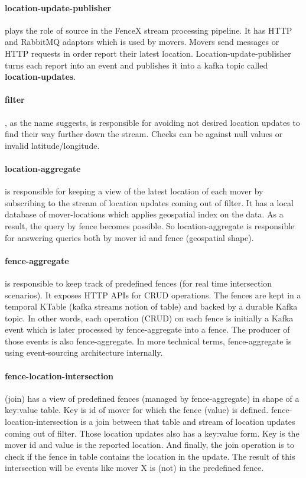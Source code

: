 \documentclass[a4]{report}
\begin{document}
        \paragraph{location-update-publisher} plays the role of source in the FenceX stream processing pipeline.
        It has HTTP and RabbitMQ adaptors which is used by movers.
        Movers send messages or HTTP requests in order report their latest location.
        Location-update-publisher turns each report into an event and publishes it into a kafka topic called
        \textbf{location-updates}.

        \paragraph{filter}, as the name suggests, is responsible  for avoiding not desired location updates to find their
        way further down the stream.
        Checks can be against null values or invalid latitude/longitude.

        \paragraph{location-aggregate} is responsible for keeping a view of the latest location of each mover by
        subscribing to the stream of location updates coming out of filter.
        It has a local database of mover-locations which applies geospatial index on the data.
        As a result, the query by fence becomes possible.
        So location-aggregate is responsible for answering queries both by mover id and fence (geospatial shape).

        \paragraph{fence-aggregate} is responsible to keep track of predefined fences (for real time intersection scenarios).
        It exposes HTTP APIs for CRUD operations.
        The fences are kept in a temporal KTable (kafka streams notion of table) and backed by a durable Kafka topic.
        In other words, each operation (CRUD) on each fence is initially a Kafka event which is later processed by
        fence-aggregate into a fence.
        The producer of those events is also fence-aggregate.
        In more technical terms, fence-aggregate is using event-sourcing architecture internally.

        \paragraph{fence-location-intersection} (join) has a view of predefined fences (managed by fence-aggregate) in
        shape of a key:value table.
        Key is id of mover for which the fence (value) is defined.
        fence-location-intersection is a join between that table and stream of location updates coming out of filter.
        Those location updates also has a key:value form.
        Key is the mover id and value is the reported location.
        And finally, the join operation is to check if the fence in table contains the location in the update.
        The result of this intersection will be events like mover X is (not) in the predefined fence.
\end{document}
